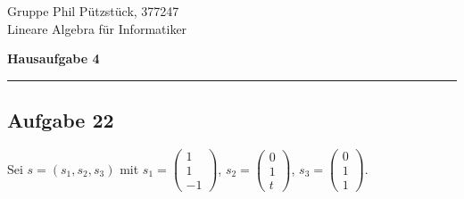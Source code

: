 \documentclass[a4paper,graphics,11pt]{article}
\newcommand{\aufgabe}[1]{\subsection*{Aufgabe #1}}
\begin{document}
\noindent Gruppe              \hfill Phil Pützstück, 377247\\
\noindent Lineare Algebra für Informatiker\\
\begin{center}
	\LARGE{\textbf{Hausaufgabe 4}}
\end{center}
\begin{center}
\rule[0.1ex]{\textwidth}{1pt}
\end{center}



\aufgabe{22}
Sei $s = (s_1, s_2, s_3)$ mit
$s_1 = \begin{pmatrix}
    1\\
    1\\
    -1
\end{pmatrix}$,
$s_2 = \begin{pmatrix}
    0\\
    1\\
    t
\end{pmatrix}$,
$s_3 = \begin{pmatrix}
    0\\
    1\\
    1
\end{pmatrix}$.
\end{document}
